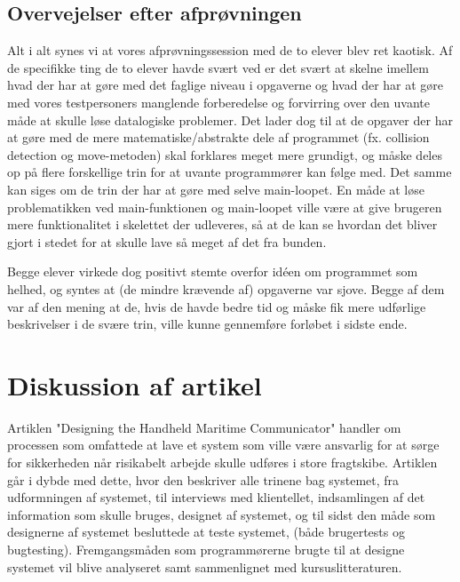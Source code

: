 \documentclass[10pt,a4paper,danish]{article}
\begin{document}
\subsection{Overvejelser efter afprøvningen}
Alt i alt synes vi at vores afprøvningssession med de to elever blev ret kaotisk.
Af de specifikke ting de to elever havde svært ved er det svært at skelne imellem
hvad der har at gøre med det faglige niveau i opgaverne og hvad der har at gøre med
vores testpersoners manglende forberedelse og forvirring over den uvante måde at 
skulle løse datalogiske problemer. Det lader dog til at de opgaver der har at gøre
med de mere matematiske/abstrakte dele af programmet (fx. collision detection og move-metoden)
skal forklares meget mere grundigt, og måske deles op på flere forskellige trin for
at uvante programmører kan følge med. Det samme kan siges om de trin der har at gøre 
med selve main-loopet. En måde at løse problematikken ved main-funktionen og main-loopet
ville være at give brugeren mere funktionalitet i skelettet der udleveres, så at 
de kan se hvordan det bliver gjort i stedet for at skulle lave så meget af det
fra bunden. 

Begge elever virkede dog positivt stemte overfor idéen om programmet som helhed, 
og syntes at (de mindre krævende af) opgaverne var sjove. Begge af dem var af den 
mening at de, hvis de havde bedre tid og måske fik mere udførlige beskrivelser i de 
svære trin, ville kunne gennemføre forløbet i sidste ende. 

\section{Diskussion af artikel}
Artiklen "Designing the Handheld Maritime Communicator" handler om processen som omfattede at
lave et system som ville være ansvarlig for at sørge for sikkerheden når risikabelt arbejde skulle udføres 
i store fragtskibe. Artiklen går i dybde med dette, hvor den beskriver alle trinene bag systemet, fra 
udformningen af systemet, til interviews med klientellet, indsamlingen af det information som skulle 
bruges, designet af systemet, og til sidst den måde som designerne af systemet besluttede at teste systemet, 
(både brugertests og bugtesting). Fremgangsmåden som programmørerne brugte til at designe systemet vil blive 
analyseret samt sammenlignet med kursuslitteraturen.
\end{document}
